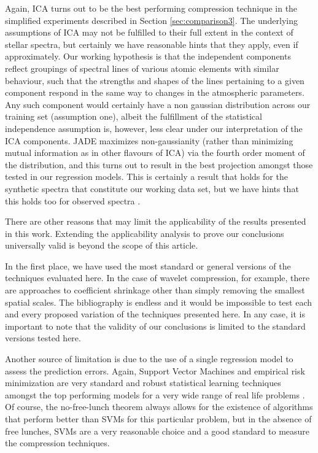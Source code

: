 \documentclass[a4paper,fleqn,usenatbib]{mnras}
\begin{document}
{{{Again, ICA turns out to be the best performing compression technique in the 
simplified experiments described in Section \ref{sec:comparison3}. The 
underlying assumptions of ICA may not be 
fulfilled to their full extent in the context of stellar 
spectra, but certainly we have reasonable hints that they 
apply, even if approximately. Our 
working hypothesis is that the independent components reflect 
groupings of spectral lines of various atomic elements with 
similar behaviour, such that the strengths and shapes of the 
lines pertaining to a given component respond in the same way 
to changes in the atmospheric parameters. Any such component 
would certainly have a non gaussian distribution across our 
training set (assumption one), albeit the fulfillment of the 
statistical independence assumption is, however, less clear 
under our interpretation of the ICA components. JADE maximizes 
non-gaussianity (rather than minimizing mutual information as 
in other flavours of ICA) via the fourth order moment of the 
distribution, and this turns out to result in the best projection 
amongst those tested in our regression models. This is certainly 
a result that holds for the synthetic spectra that constitute 
our working data set, but we have hints that this holds too for 
observed spectra \citep{2013A&A...550A.120S}.
 
There are other reasons that may limit the applicability of the results 
presented in this work. Extending the applicability analysis to prove our 
conclusions universally valid is beyond the scope of this article.

In the first place, we have used the most standard or general versions of 
the techniques evaluated here. In the case of wavelet compression, for example, 
there are approaches to coefficient shrinkage other than simply removing 
the smallest spatial scales. The bibliography is endless and it would be 
impossible to test each and every proposed variation of the techniques 
presented here. In any case, it is important to note that the validity of 
our conclusions is limited to the standard versions tested here. 

Another source of limitation is due to the use of a single regression model to 
assess the prediction errors. Again, Support Vector Machines and empirical 
risk minimization are very standard and robust statistical learning techniques 
amongst the top performing models for a very wide range of real life problems 
\citep{vanGestel2004}. Of course, the no-free-lunch theorem \citep[see][and 
references therein for a formal statement of the theorem]{Igel2005} always 
allows for the existence of algorithms that perform better than SVMs for this 
particular problem, but in the absence of free lunches, SVMs are a very 
reasonable choice and a good standard to measure the compression 
techniques.

}}}
\end{document}
